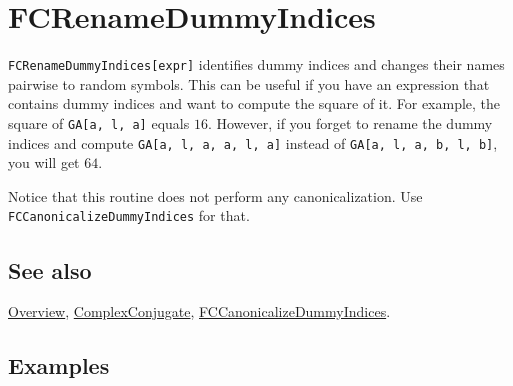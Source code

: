 \documentclass[../FeynCalcManual.tex]{subfiles}
\begin{document}
\hypertarget{fcrenamedummyindices}{
\section{FCRenameDummyIndices}\label{fcrenamedummyindices}}

\texttt{FCRenameDummyIndices[\allowbreak{}expr]} identifies dummy
indices and changes their names pairwise to random symbols. This can be
useful if you have an expression that contains dummy indices and want to
compute the square of it. For example, the square of
\texttt{GA[\allowbreak{}a,\ \allowbreak{}l,\ \allowbreak{}a]} equals
\(16\). However, if you forget to rename the dummy indices and compute
\texttt{GA[\allowbreak{}a,\ \allowbreak{}l,\ \allowbreak{}a,\ \allowbreak{}a,\ \allowbreak{}l,\ \allowbreak{}a]}
instead of
\texttt{GA[\allowbreak{}a,\ \allowbreak{}l,\ \allowbreak{}a,\ \allowbreak{}b,\ \allowbreak{}l,\ \allowbreak{}b]},
you will get \(64\).

Notice that this routine does not perform any canonicalization. Use
\texttt{FCCanonicalizeDummyIndices} for that.

\subsection{See also}

\hyperlink{toc}{Overview},
\hyperlink{complexconjugate}{ComplexConjugate},
\hyperlink{fccanonicalizedummyindices}{FCCanonicalizeDummyIndices}.

\subsection{Examples}

\begin{Shaded}
\begin{Highlighting}[]
\OperatorTok{[}\OperatorTok{,}\OperatorTok{]}\OperatorTok{[}\OperatorTok{,}\OperatorTok{]} \SpecialCharTok{+}\OperatorTok{[}\OperatorTok{,}\OperatorTok{]}\OperatorTok{[}\OperatorTok{,}\OperatorTok{]} \SpecialCharTok{+}\OperatorTok{[}\OperatorTok{,}\OperatorTok{]}\OperatorTok{[}\OperatorTok{,}\OperatorTok{]} 
 
\OperatorTok{[}\SpecialCharTok{\%}\OperatorTok{]} \SpecialCharTok{//}
\end{Highlighting}
\end{Shaded}
\end{document}
